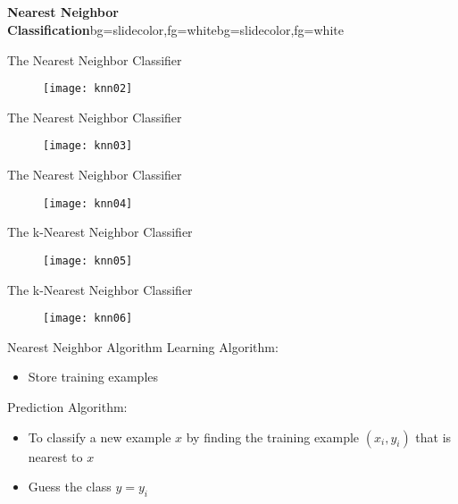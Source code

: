 \subsection{}

\begin{frame}{}
\begin{variableblock}{\centering \Large \textbf{\vspace{4pt}\newline Nearest Neighbor Classification\vspace{4pt}}}{bg=slidecolor,fg=white}{bg=slidecolor,fg=white}
\end{variableblock}
\end{frame}

\begin{frame}{The Nearest Neighbor Classifier}
\begin{figure}
\texttt{[image: knn02]}
\end{figure}
\end{frame}

\begin{frame}{The Nearest Neighbor Classifier}
\begin{figure}
\texttt{[image: knn03]}
\end{figure}
\end{frame}

\begin{frame}{The Nearest Neighbor Classifier}
\vspace{-0.5cm}
\begin{figure}
\texttt{[image: knn04]}
\end{figure}
\end{frame}

\begin{frame}{The k-Nearest Neighbor Classifier}
\vspace{-0.5cm}
\begin{figure}
\texttt{[image: knn05]}
\end{figure}
\end{frame}

\begin{frame}{The k-Nearest Neighbor Classifier}
\begin{figure}
\texttt{[image: knn06]}
\end{figure}
\end{frame}

\begin{frame}{Nearest Neighbor Algorithm}
Learning Algorithm:
\begin{itemize}
\item Store training examples
\end{itemize}
Prediction Algorithm:
\begin{itemize}
\item To classify a new example $x$ by finding the training example $(x_i,y_i)$ that is nearest to $x$
\item Guess the class $y =y_i$
\end{itemize}
\end{frame}


